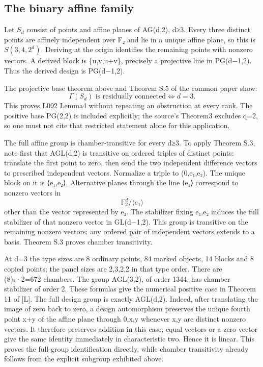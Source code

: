 \subsection{The binary affine family}\label{the-binary-affine-family}

Let \(S_d\) consist of points and affine planes of AG(d,2), d≥3. Every
three distinct points are affinely independent over F₂ and lie in a
unique affine plane, so this is \(S(3,4,2^d)\). Deriving at the origin
identifies the remaining points with nonzero vectors. A derived block is
\{u,v,u+v\}, precisely a projective line in PG(d−1,2). Thus the derived
design is PG(d−1,2).

The projective base theorem above and Theorem S.5 of the common paper
show: \[
\Gamma(S_d)\text{ is residually connected}\iff d=3.
\tag{C4}
\] This proves L092 Lemma4 without repeating an obstruction at every
rank. The positive base PG(2,2) is included explicitly; the source's
Theorem3 excludes q=2, so one must not cite that restricted statement
alone for this application.

The full affine group is chamber-transitive for every d≥3. To apply
Theorem S.3, note first that AGL(d,2) is transitive on ordered triples
of distinct points: translate the first point to zero, then send the two
independent difference vectors to prescribed independent vectors.
Normalize a triple to (0,e₁,e₂). The unique block on it is ⟨e₁,e₂⟩.
Alternative planes through the line ⟨e₁⟩ correspond to nonzero vectors
in \[
\mathbb F_2^d/\langle e_1\rangle
\] other than the vector represented by e₂. The stabilizer fixing e₁,e₂
induces the full stabilizer of that nonzero vector in GL(d−1,2). This
group is transitive on the remaining nonzero vectors: any ordered pair
of independent vectors extends to a basis. Theorem S.3 proves chamber
transitivity.

At d=3 the type sizes are 8 ordinary points, 84 marked objects, 14
blocks and 8 copied points; the panel sizes are 2,3,2,2 in that type
order. There are (8)₃·2=672 chambers. The group AGL(3,2), of order 1344,
has chamber stabilizer of order 2. These formulas give the numerical
positive case in Theorem 11 of {[}L{]}. The full design group is exactly
AGL(d,2). Indeed, after translating the image of zero back to zero, a
design automorphism preserves the unique fourth point x+y of the affine
plane through 0,x,y whenever x,y are distinct nonzero vectors. It
therefore preserves addition in this case; equal vectors or a zero
vector give the same identity immediately in characteristic two. Hence
it is linear. This proves the full-group identification directly, while
chamber transitivity already follows from the explicit subgroup
exhibited above.

